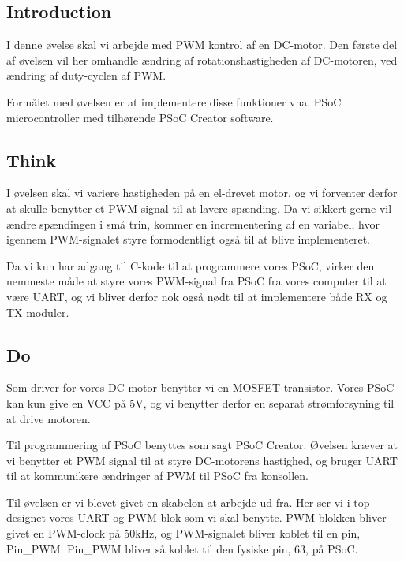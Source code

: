 \documentclass[../main.tex]{subfiles}
\begin{document}
\subsection{Introduction}
I denne øvelse skal vi arbejde med PWM kontrol af en DC-motor. Den første del af øvelsen vil her omhandle ændring af rotationshastigheden af DC-motoren, ved ændring af duty-cyclen af PWM.

Formålet med øvelsen er at implementere disse funktioner vha. PSoC microcontroller med tilhørende PSoC Creator software. 

\subsection{Think}
I øvelsen skal vi variere hastigheden på en el-drevet motor, og vi forventer derfor at skulle benytter et PWM-signal til at lavere spænding. Da vi sikkert gerne vil ændre spændingen i små trin, kommer en incrementering af en variabel, hvor igennem PWM-signalet styre formodentligt også til at blive implementeret.

Da vi kun har adgang til C-kode til at programmere vores PSoC, virker den nemmeste måde at styre vores PWM-signal fra PSoC fra vores computer til at være UART, og vi bliver derfor nok også nødt til at implementere både RX og TX moduler.

\subsection{Do}
Som driver for vores DC-motor benytter vi en MOSFET-transistor. Vores PSoC kan kun give en VCC på 5V, og vi benytter derfor en separat strømforsyning til at drive motoren.


Til programmering af PSoC benyttes som sagt PSoC Creator. Øvelsen kræver at vi benytter et PWM signal til at styre DC-motorens hastighed, og bruger UART til at kommunikere ændringer af PWM til PSoC fra konsollen.

Til øvelsen er vi blevet givet en skabelon at arbejde ud fra. Her ser vi i top designet vores UART og PWM blok som vi skal benytte. PWM-blokken bliver givet en PWM-clock på 50kHz, og PWM-signalet bliver koblet til en pin, Pin\_PWM. Pin\_PWM bliver så koblet til den fysiske pin, 63, på PSoC.

\end{document}
